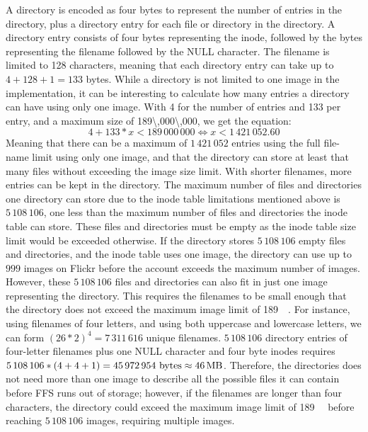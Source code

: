 A directory is encoded as four bytes to represent the number of entries in the directory, plus a directory entry for each file or directory in the directory. A directory entry consists of four bytes representing the inode, followed by the bytes representing the filename followed by the NULL character. The filename is limited to 128 characters, meaning that each directory entry can take up to $ 4 + 128 + 1 = 133$ bytes. While a directory is not limited to one image in the implementation, it can be interesting to calculate how many entries a directory can have using only one image. With \SI{4}{\byte} for the number of entries and \SI{133}{\byte} per entry, and a maximum size of \SI{189\,000\,000}{\byte}, we get the equation:
$$
	4 + 133 * x < 189\,000\,000 \Longleftrightarrow x < 1\,421\,052.60
$$
Meaning that there can be a maximum of $1\,421\,052$ entries using the full file-name limit using only one image, and that the directory can store at least that many files without exceeding the image size limit. With shorter filenames, more entries can be kept in the directory. The maximum number of files and directories one directory can store due to the inode table limitations mentioned above is $5\,108\,106$, one less than the maximum number of files and directories the inode table can store. These files and directories must be empty as the inode table size limit would be exceeded otherwise. If the directory stores $5\,108\,106$ empty files and directories, and the inode table uses one image, the directory can use up to $999$ images on Flickr before the account exceeds the maximum number of images. However, these $5\,108\,106$ files and directories can also fit in just one image representing the directory. This requires the filenames to be small enough that the directory does not exceed the maximum image limit of \SI{189}{\mega\byte}. For instance, using filenames of four letters, and using both uppercase and lowercase letters, we can form $(26*2)^4 = 7\,311\,616$ unique filenames. $5\,108\,106$ directory entries of \mbox{four-letter} filenames plus one NULL character and four byte inodes requires $5\,108\,106 * (4 + 4 + 1) = 45\,972\,954\text{ bytes} \approx \text{\SI{46}{\mega\byte}}$. Therefore, the directories does not need more than one image to describe all the possible files it can contain before \gls{FFS} runs out of storage; however, if the filenames are longer than four characters, the directory could exceed the maximum image limit of \SI{189}{\mega\byte} before reaching $5\,108\,106$ images, requiring multiple images.

